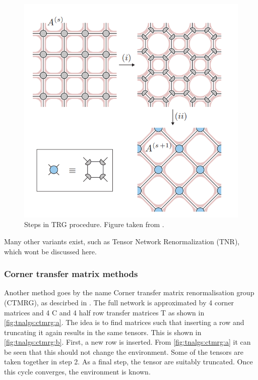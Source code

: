 \begin{figure}
    \center
    \includegraphics[width=0.5 \textwidth]{Figuren/tnalgs/TRG.png}
    \caption{ Steps in TRG procedure. Figure taken from \cite{Hauru}.  }
    \label{fig:tnalgs:trg}
\end{figure}

Many other variants exist, such as Tensor Network Renormalization (TNR), which wont be discussed here.

\subsubsection{Corner transfer matrix  methods}

Another method goes by the name Corner transfer matrix renormalisation group (CTMRG), as descirbed in \cite{orus}. The full network is approximated by 4 corner matrices and 4 C and 4 half row transfer matrices T as shown in \cref{fig:tnalgs:ctmrg:a}. The idea is to find matrices such that inserting a row and truncating it again results in the same tensors. This is shown in \cref{fig:tnalgs:ctmrg:b}. First, a new row is inserted. From \cref{fig:tnalgs:ctmrg:a} it can be seen that this should not change the environment. Some of the tensors are taken together in step 2. As a final step, the tensor are suitably truncated. Once this cycle converges, the environment is known.

